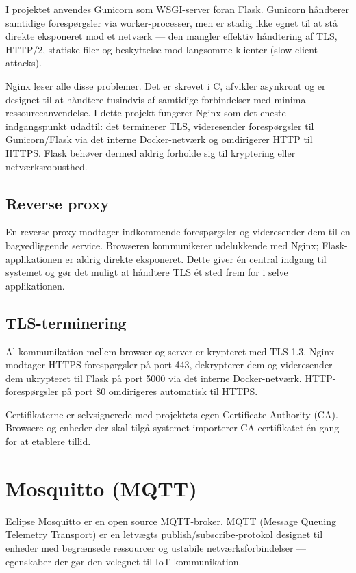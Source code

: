 \documentclass[a4paper,12pt]{article}
\begin{document}
I projektet anvendes Gunicorn som WSGI-server foran Flask. Gunicorn håndterer samtidige forespørgsler via worker-processer, men er stadig ikke egnet til at stå direkte eksponeret mod et netværk — den mangler effektiv håndtering af TLS, HTTP/2, statiske filer og beskyttelse mod langsomme klienter (slow-client attacks).

Nginx løser alle disse problemer. Det er skrevet i C, afvikler asynkront og er designet til at håndtere tusindvis af samtidige forbindelser med minimal ressourceanvendelse. I dette projekt fungerer Nginx som det eneste indgangspunkt udadtil: det terminerer TLS, videresender forespørgsler til Gunicorn/Flask via det interne Docker-netværk og omdirigerer HTTP til HTTPS. Flask behøver dermed aldrig forholde sig til kryptering eller netværksrobusthed.

\subsection{Reverse proxy}

En reverse proxy modtager indkommende forespørgsler og videresender dem til en bagvedliggende service. Browseren kommunikerer udelukkende med Nginx; Flask-applikationen er aldrig direkte eksponeret. Dette giver én central indgang til systemet og gør det muligt at håndtere TLS ét sted frem for i selve applikationen.

\subsection{TLS-terminering}

Al kommunikation mellem browser og server er krypteret med TLS 1.3. Nginx modtager HTTPS-forespørgsler på port 443, dekrypterer dem og videresender dem ukrypteret til Flask på port 5000 via det interne Docker-netværk. HTTP-forespørgsler på port 80 omdirigeres automatisk til HTTPS.

Certifikaterne er selvsignerede med projektets egen Certificate Authority (CA). Browsere og enheder der skal tilgå systemet importerer CA-certifikatet én gang for at etablere tillid.

\section{Mosquitto (MQTT)}

Eclipse Mosquitto er en open source MQTT-broker. MQTT (Message Queuing Telemetry Transport) er en letvægts publish/subscribe-protokol designet til enheder med begrænsede ressourcer og ustabile netværksforbindelser — egenskaber der gør den velegnet til IoT-kommunikation.
\end{document}
